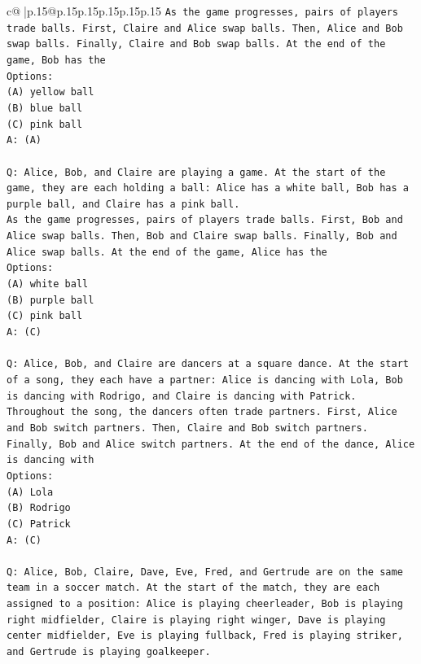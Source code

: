 \documentclass{article}
\begin{document}
{\begin{supertabular}{c@{$\;$}|p{.15\linewidth}@{}p{.15\linewidth}p{.15\linewidth}p{.15\linewidth}p{.15\linewidth}p{.15\linewidth}}
{{{\texttt{As the game progresses, pairs of players trade balls. First, Claire and Alice swap balls. Then, Alice and Bob swap balls. Finally, Claire and Bob swap balls. At the end of the game, Bob has the} \\
\texttt{Options:} \\
\texttt{(A) yellow ball} \\
\texttt{(B) blue ball} \\
\texttt{(C) pink ball} \\
\texttt{A: (A)} \\
\\ 
\texttt{Q: Alice, Bob, and Claire are playing a game. At the start of the game, they are each holding a ball: Alice has a white ball, Bob has a purple ball, and Claire has a pink ball.} \\
\texttt{As the game progresses, pairs of players trade balls. First, Bob and Alice swap balls. Then, Bob and Claire swap balls. Finally, Bob and Alice swap balls. At the end of the game, Alice has the} \\
\texttt{Options:} \\
\texttt{(A) white ball} \\
\texttt{(B) purple ball} \\
\texttt{(C) pink ball} \\
\texttt{A: (C)} \\
\\ 
\texttt{Q: Alice, Bob, and Claire are dancers at a square dance. At the start of a song, they each have a partner: Alice is dancing with Lola, Bob is dancing with Rodrigo, and Claire is dancing with Patrick.} \\
\texttt{Throughout the song, the dancers often trade partners. First, Alice and Bob switch partners. Then, Claire and Bob switch partners. Finally, Bob and Alice switch partners. At the end of the dance, Alice is dancing with} \\
\texttt{Options:} \\
\texttt{(A) Lola} \\
\texttt{(B) Rodrigo} \\
\texttt{(C) Patrick} \\
\texttt{A: (C)} \\
\\ 
\texttt{Q: Alice, Bob, Claire, Dave, Eve, Fred, and Gertrude are on the same team in a soccer match. At the start of the match, they are each assigned to a position: Alice is playing cheerleader, Bob is playing right midfielder, Claire is playing right winger, Dave is playing center midfielder, Eve is playing fullback, Fred is playing striker, and Gertrude is playing goalkeeper.} \\
}}}
\end{supertabular}}
\end{document}
